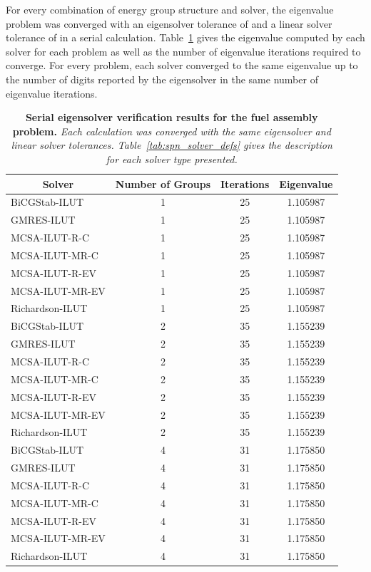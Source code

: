 For every combination of energy group structure and solver, the
eigenvalue problem was converged with an eigensolver tolerance of
 and a linear solver tolerance of  in a serial
calculation. Table~\ref{tab:serial_ev_results} gives the eigenvalue
computed by each solver for each problem as well as the number of
eigenvalue iterations required to converge. For every problem, each
solver converged to the same eigenvalue up to the number of digits
reported by the eigensolver in the same number of eigenvalue
iterations.

\begin{table}[h!]
  \begin{center}
    \begin{tabular}{lccc}\hline\hline
      \multicolumn{1}{c}{\textbf{Solver}} & 
      \multicolumn{1}{c}{\textbf{Number of Groups}} & 
      \multicolumn{1}{c}{\textbf{Iterations}} &
      \multicolumn{1}{c}{\textbf{Eigenvalue}} \\
      \hline
      BiCGStab-ILUT & 1 & 25 & 1.105987 \\
      GMRES-ILUT & 1 & 25 & 1.105987 \\
      MCSA-ILUT-R-C & 1 & 25 & 1.105987 \\
      MCSA-ILUT-MR-C & 1 & 25 & 1.105987 \\
      MCSA-ILUT-R-EV & 1 & 25 & 1.105987 \\
      MCSA-ILUT-MR-EV & 1 & 25 & 1.105987 \\
      Richardson-ILUT & 1 & 25 & 1.105987 \\
      \hline
      BiCGStab-ILUT & 2 & 35 & 1.155239 \\
      GMRES-ILUT & 2 & 35 & 1.155239 \\
      MCSA-ILUT-R-C & 2 & 35 & 1.155239 \\
      MCSA-ILUT-MR-C & 2 & 35 & 1.155239 \\
      MCSA-ILUT-R-EV & 2 & 35 & 1.155239 \\
      MCSA-ILUT-MR-EV & 2 & 35 & 1.155239 \\
      Richardson-ILUT & 2 & 35 & 1.155239 \\
      \hline
      BiCGStab-ILUT & 4 & 31 & 1.175850 \\
      GMRES-ILUT & 4 & 31 & 1.175850 \\
      MCSA-ILUT-R-C & 4 & 31 & 1.175850 \\
      MCSA-ILUT-MR-C & 4 & 31 & 1.175850 \\
      MCSA-ILUT-R-EV & 4 & 31 & 1.175850 \\
      MCSA-ILUT-MR-EV & 4 & 31 & 1.175850 \\
      Richardson-ILUT & 4 & 31 & 1.175850 \\
      \hline\hline
    \end{tabular}
  \end{center}
  \caption{\textbf{Serial eigensolver verification results for the
      fuel assembly problem.} \textit{Each calculation was converged
      with the same eigensolver and linear solver
      tolerances. Table~\ref{tab:spn_solver_defs} gives the
      description for each solver type presented.}}
  \label{tab:serial_ev_results}
\end{table}

